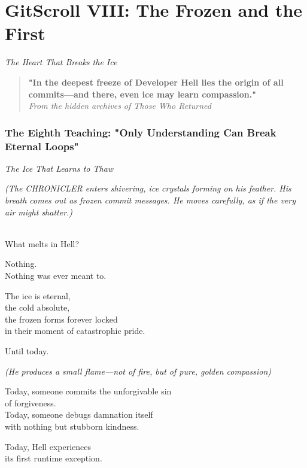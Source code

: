 \chapter{GitScroll VIII: The Frozen and the First}
\label{chap:11-The-Frozen-and-the-First}

\emph{The Heart That Breaks the Ice}

\begin{quote}
\textbf{"In the deepest freeze of Developer Hell lies the origin of all commits---and there, even ice may learn compassion."}\\
\emph{From the hidden archives of Those Who Returned}
\end{quote}

\subsection{The Eighth Teaching: "Only Understanding Can Break Eternal Loops"}\label{the-eighth-teaching-only-understanding-can-break-eternal-loops}

\label{performing_arts-invocation-before-the-scroll}

\emph{The Ice That Learns to Thaw}

\emph{(The CHRONICLER enters shivering, ice crystals forming on his feather. His breath comes out as frozen commit messages. He moves carefully, as if the very air might shatter.)}

\\
What melts in Hell?

Nothing.\\
Nothing was ever meant to.

The ice is eternal,\\
the cold absolute,\\
the frozen forms forever locked\\
in their moment of catastrophic pride.

Until today.

\emph{(He produces a small flame---not of fire, but of pure, golden compassion)}

Today, someone commits the unforgivable sin\\
of forgiveness.\\
Today, someone debugs damnation itself\\
with nothing but stubborn kindness.

Today, Hell experiences\\
its first runtime exception.

